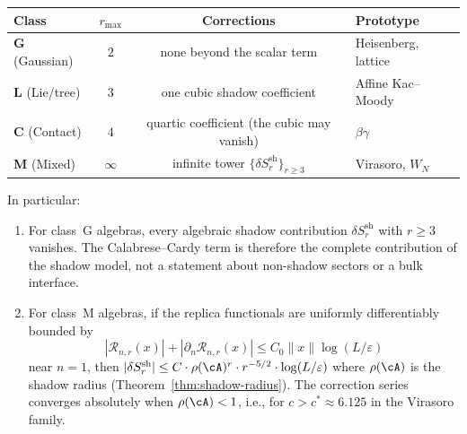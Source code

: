 \begin{proposition}
\begin{center}
\renewcommand{\arraystretch}{1.3}
\begin{tabular}{l@{\quad}c@{\quad}c@{\quad}l}
\textbf{Class} & $r_{\max}$ & \textbf{Corrections}
& \textbf{Prototype} \\
\midrule
\textbf{G} \textup{(Gaussian)} & $2$ &
 none beyond the scalar term &
 Heisenberg, lattice \\
\textbf{L} \textup{(Lie/tree)} & $3$ &
 one cubic shadow coefficient &
 Affine Kac--Moody \\
\textbf{C} \textup{(Contact)} & $4$ &
 quartic coefficient \textup{(}the cubic may vanish\textup{)} &
 $\beta\gamma$ \\
\textbf{M} \textup{(Mixed)} & $\infty$ &
 infinite tower $\{\delta S_r^{\mathrm{sh}}\}_{r \ge 3}$ &
 Virasoro, $W_N$ \\
\end{tabular}
\end{center}
In particular:
\begin{enumerate}[label=\textup{(\alph*)}]
\item For class~G algebras, every algebraic shadow contribution
 $\delta S_r^{\mathrm{sh}}$ with $r\ge3$ vanishes.  The
 Calabrese--Cardy term is therefore the complete contribution
 of the shadow model, not a statement about non-shadow sectors or a
 bulk interface.
\item For class~M algebras, if the replica functionals are
 uniformly differentiably bounded by
 \[
 |\mathcal R_{n,r}(x)|+
 |\partial_n\mathcal R_{n,r}(x)|
 \le C_0\|x\|\log(L/\varepsilon)
 \]
 near $n=1$, then
 $|\delta S_r^{\mathrm{sh}}| \le C \cdot \rho(\cA)^r \cdot r^{-5/2}
 \cdot \log(L/\varepsilon)$ where $\rho(\cA)$ is the shadow
 radius \textup{(Theorem~\textup{\ref{thm:shadow-radius}}\textup{)}.}
 The correction series converges absolutely when
 $\rho(\cA) < 1$, i.e., for $c > c^* \approx 6.125$
 in the Virasoro family.
\end{enumerate}
\end{proposition}

